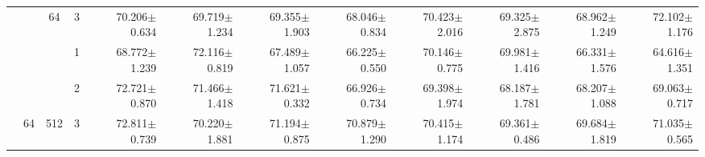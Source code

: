 \begin{table}[htpb]
{\begin{tabular}{c|c|c|c|rr|rr|rr|rr}
                                 &                                                                                 & \multirow{-3}{*}{64}                                                                   & 3                                                                                         & 70.206$\pm$0.634                        & 69.719$\pm$1.234                        & 69.355$\pm$1.903                        & 68.046$\pm$0.834                        & 70.423$\pm$2.016                        & 69.325$\pm$2.875                        & 68.962$\pm$1.249                        & 72.102$\pm$1.176                       \\ \cline{3-12} 
                                 &                                                                                 &                                                                                        & 1                                                                                         & 68.772$\pm$1.239                        & 72.116$\pm$0.819                        & 67.489$\pm$1.057                        & 66.225$\pm$0.550                        & 70.146$\pm$0.775                        & 69.981$\pm$1.416                        & 66.331$\pm$1.576                        & 64.616$\pm$1.351                       \\
                                 &                                                                                 &                                                                                        & 2                                                                                         & 72.721$\pm$0.870                        & 71.466$\pm$1.418                        & 71.621$\pm$0.332                        & 66.926$\pm$0.734                        & 69.398$\pm$1.974                        & 68.187$\pm$1.781                        & 68.207$\pm$1.088                        & 69.063$\pm$0.717                       \\
                                 & \multirow{-6}{*}{64}                                                            & \multirow{-3}{*}{512}                                                                  & 3                                                                                         & 72.811$\pm$0.739                        & 70.220$\pm$1.881                        & 71.194$\pm$0.875                        & 70.879$\pm$1.290                        & 70.415$\pm$1.174                        & 69.361$\pm$0.486                        & 69.684$\pm$1.819                        & 71.035$\pm$0.565                       \\ \cline{2-12} 

\end{tabular}}
\end{table}
